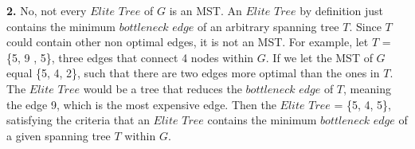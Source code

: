 \documentclass{article}
\begin{document}
\textbf{2.} No, not every $Elite$ $Tree$ of $G$ is an MST. An $Elite$ $Tree$ by definition just contains the minimum $bottleneck$ $edge$ of an arbitrary spanning tree $T$. Since $T$ could contain other non optimal edges, it is not an MST. For example, let $T$ = \{5, 9 , 5\}, three edges that connect 4 nodes within $G$. If we let the MST of $G$ equal \{5, 4, 2\}, such that there are two edges more optimal than the ones in $T$. The $Elite$ $Tree$ would be a tree that reduces the $bottleneck$ $edge$ of $T$, meaning the edge 9, which is the most expensive edge. Then the $Elite$ $Tree$ = \{5, 4, 5\}, satisfying the criteria that an $Elite$ $Tree$ contains the minimum $bottleneck$ $edge$ of a given spanning tree $T$ within $G$.\\
\end{document}
